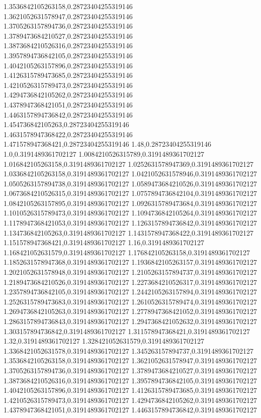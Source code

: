 1.3536842105263158,0.28723404255319146
1.3621052631578947,0.28723404255319146
1.3705263157894736,0.28723404255319146
1.3789473684210527,0.28723404255319146
1.3873684210526316,0.28723404255319146
1.3957894736842105,0.28723404255319146
1.4042105263157896,0.28723404255319146
1.4126315789473685,0.28723404255319146
1.4210526315789473,0.28723404255319146
1.4294736842105262,0.28723404255319146
1.4378947368421051,0.28723404255319146
1.4463157894736842,0.28723404255319146
1.454736842105263,0.28723404255319146
1.4631578947368422,0.28723404255319146
1.471578947368421,0.28723404255319146
1.48,0.28723404255319146
1.0,0.3191489361702127
1.0084210526315789,0.3191489361702127
1.016842105263158,0.3191489361702127
1.0252631578947369,0.3191489361702127
1.0336842105263158,0.3191489361702127
1.0421052631578946,0.3191489361702127
1.0505263157894738,0.3191489361702127
1.0589473684210526,0.3191489361702127
1.0673684210526315,0.3191489361702127
1.0757894736842104,0.3191489361702127
1.0842105263157895,0.3191489361702127
1.0926315789473684,0.3191489361702127
1.1010526315789473,0.3191489361702127
1.1094736842105264,0.3191489361702127
1.1178947368421053,0.3191489361702127
1.1263157894736842,0.3191489361702127
1.134736842105263,0.3191489361702127
1.1431578947368422,0.3191489361702127
1.151578947368421,0.3191489361702127
1.16,0.3191489361702127
1.168421052631579,0.3191489361702127
1.176842105263158,0.3191489361702127
1.1852631578947368,0.3191489361702127
1.1936842105263157,0.3191489361702127
1.2021052631578948,0.3191489361702127
1.2105263157894737,0.3191489361702127
1.2189473684210526,0.3191489361702127
1.2273684210526317,0.3191489361702127
1.2357894736842105,0.3191489361702127
1.2442105263157894,0.3191489361702127
1.2526315789473683,0.3191489361702127
1.2610526315789474,0.3191489361702127
1.2694736842105263,0.3191489361702127
1.2778947368421052,0.3191489361702127
1.2863157894736843,0.3191489361702127
1.2947368421052632,0.3191489361702127
1.303157894736842,0.3191489361702127
1.311578947368421,0.3191489361702127
1.32,0.3191489361702127
1.328421052631579,0.3191489361702127
1.3368421052631578,0.3191489361702127
1.345263157894737,0.3191489361702127
1.3536842105263158,0.3191489361702127
1.3621052631578947,0.3191489361702127
1.3705263157894736,0.3191489361702127
1.3789473684210527,0.3191489361702127
1.3873684210526316,0.3191489361702127
1.3957894736842105,0.3191489361702127
1.4042105263157896,0.3191489361702127
1.4126315789473685,0.3191489361702127
1.4210526315789473,0.3191489361702127
1.4294736842105262,0.3191489361702127
1.4378947368421051,0.3191489361702127
1.4463157894736842,0.3191489361702127
